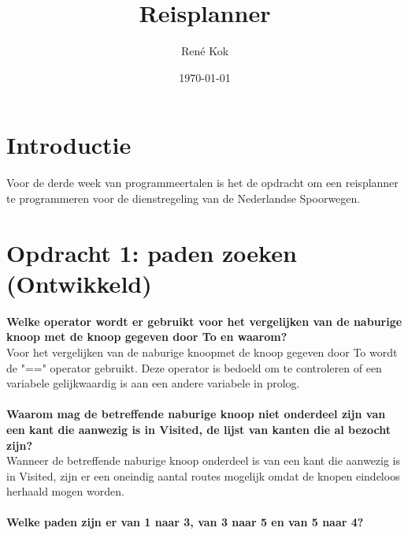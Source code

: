 \documentclass{uva-inf-article}
\title{Reisplanner}
\author{René Kok}
\date{\today}
\begin{document}
\maketitle




\section{Introductie}
Voor de derde week van programmeertalen is het de opdracht om een reisplanner te programmeren 
voor de dienstregeling van de Nederlandse Spoorwegen.

\section{Opdracht 1: paden zoeken (Ontwikkeld)}
\textbf{Welke operator wordt er gebruikt voor het vergelijken van de naburige knoop met de knoop gegeven door To en waarom?}\\
Voor het vergelijken van de naburige knoopmet de knoop gegeven door To wordt de "==" operator gebruikt. 
Deze operator is bedoeld om te controleren of een variabele gelijkwaardig is aan een andere variabele in prolog.\\\\  
\textbf{Waarom mag de betreffende naburige knoop niet onderdeel zijn van een kant die aanwezig is in Visited, de lijst van kanten die al bezocht zijn?}\\
Wanneer de betreffende naburige knoop onderdeel is van een kant die aanwezig is in Visited, 
zijn er een oneindig aantal routes mogelijk omdat de knopen eindeloos herhaald mogen worden.\\\\
\textbf{Welke paden zijn er van 1 naar 3, van 3 naar 5 en van 5 naar 4?}\\
\end{document}
